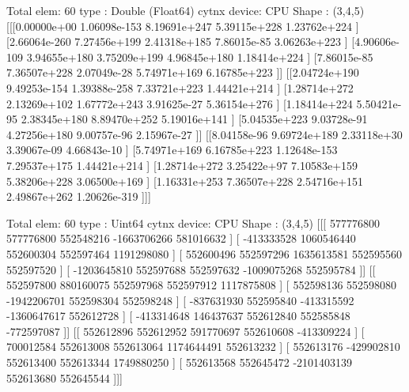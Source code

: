 \begin{DoxyVerbInclude}

Total elem: 60
type  : Double (Float64)
cytnx device: CPU
Shape : (3,4,5)
[[[0.00000e+00 1.06098e-153 8.19691e+247 5.39115e+228 1.23762e+224 ]
  [2.66064e-260 7.27456e+199 2.41318e+185 7.86015e-85 3.06263e+223 ]
  [4.90606e-109 3.94655e+180 3.75209e+199 4.96845e+180 1.18414e+224 ]
  [7.86015e-85 7.36507e+228 2.07049e-28 5.74971e+169 6.16785e+223 ]]
 [[2.04724e+190 9.49253e-154 1.39388e-258 7.33721e+223 1.44421e+214 ]
  [1.28714e+272 2.13269e+102 1.67772e+243 3.91625e-27 5.36154e+276 ]
  [1.18414e+224 5.50421e-95 2.38345e+180 8.89470e+252 5.19016e+141 ]
  [5.04535e+223 9.03728e-91 4.27256e+180 9.00757e-96 2.15967e-27 ]]
 [[8.04158e-96 9.69724e+189 2.33118e+30 3.39067e-09 4.66843e-10 ]
  [5.74971e+169 6.16785e+223 1.12648e-153 7.29537e+175 1.44421e+214 ]
  [1.28714e+272 3.25422e+97 7.10583e+159 5.38206e+228 3.06500e+169 ]
  [1.16331e+253 7.36507e+228 2.54716e+151 2.49867e+262 1.20626e-319 ]]]



Total elem: 60
type  : Uint64
cytnx device: CPU
Shape : (3,4,5)
[[[          577776800           577776800           552548216         -1663706266           581016632 ]
  [         -413333528          1060546440           552600304           552597464          1191298080 ]
  [          552600496           552597296          1635613581           552595560           552597520 ]
  [        -1203645810           552597688           552597632         -1009075268           552595784 ]]
 [[          552597800           880160075           552597968           552597912          1117875808 ]
  [          552598136           552598080         -1942206701           552598304           552598248 ]
  [         -837631930           552595840          -413315592         -1360647617           552612728 ]
  [         -413314648           146437637           552612840           552585848          -772597087 ]]
 [[          552612896           552612952           591770697           552610608          -413309224 ]
  [          700012584           552613008           552613064          1174644491           552613232 ]
  [          552613176          -429902810           552613400           552613344          1749880250 ]
  [          552613568           552645472         -2101403139           552613680           552645544 ]]]




\end{DoxyVerbInclude}
